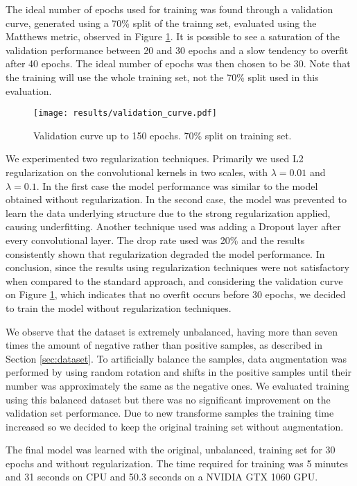         The ideal number of epochs used for training was found through a validation curve, generated using a 70\% split of the trainng set, evaluated using the Matthews metric, observed in Figure \ref{fig:validation_curve}. It is possible to see a saturation of the validation performance between 20 and 30 epochs and a slow tendency to overfit after 40 epochs. The ideal number of epochs was then chosen to be 30. Note that the training will use the whole training set, not the 70\% split used in this evaluation.

        \begin{figure}
        \centering
        \texttt{[image: results/validation\_curve.pdf]}
        \caption{Validation curve up to 150 epochs. 70\% split on training set.}
        \label{fig:validation_curve}
        \end{figure}

        We experimented two regularization techniques. Primarily we used L2 regularization on the convolutional kernels in two scales, with $\lambda = 0.01$ and $\lambda = 0.1$. In the first case the model performance was similar to the model obtained without regularization. In the second case, the model was prevented to learn the data underlying structure due to the strong regularization applied, causing underfitting. Another technique used was adding a Dropout layer after every convolutional layer. The drop rate used was 20\% and the results consistently shown that regularization degraded the model performance. In conclusion, since the results using regularization techniques were not satisfactory when compared to the standard approach, and considering the validation curve on Figure \ref{fig:validation_curve}, which indicates that no overfit occurs before 30 epochs, we decided to train the model without regularization techniques.

        We observe that the dataset is extremely unbalanced, having more than seven times the amount of negative rather than positive samples, as described in Section \ref{sec:dataset}. To artificially balance the samples, data augmentation was performed by using random rotation and shifts in the positive samples until their number was approximately the same as the negative ones. We evaluated training using this balanced dataset but there was no significant improvement on the validation set performance. Due to new transforme samples the training time increased so we decided to keep the original training set without augmentation.

	The final model was learned with the original, unbalanced, training set for 30 epochs and without regularization. The time required for training was 5 minutes and 31 seconds on CPU and 50.3 seconds on a NVIDIA GTX 1060 GPU.

